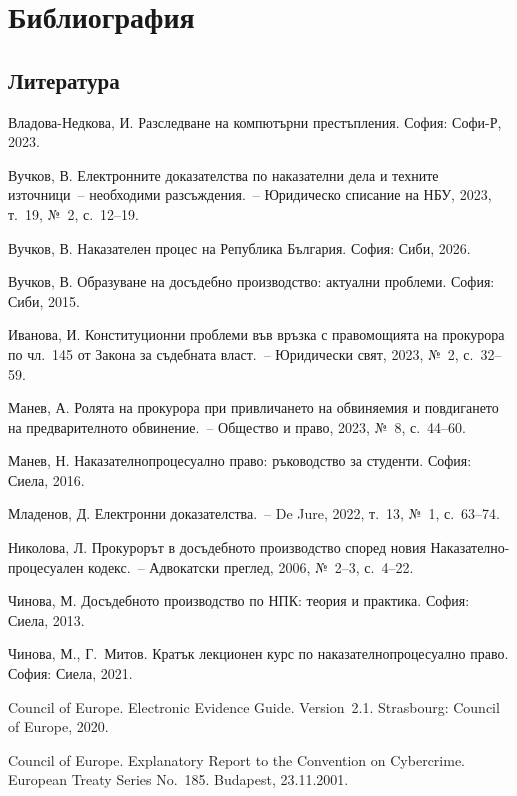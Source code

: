 \clearpage
\section*{Библиография}
\label{sec:bibliografiya}

{\small

\subsection*{Литература}
\begin{biblist}[series=bib]
\item Владова-Недкова, И. Разследване на компютърни престъпления. София: Софи-Р, 2023.
\item Вучков, В. Електронните доказателства по наказателни дела и техните източници~--
  необходими разсъждения.~-- Юридическо списание на НБУ, 2023, т.~19, №~2, с.~12--19.
\item Вучков, В. Наказателен процес на Република България. София: Сиби, 2026.
\item Вучков, В. Образуване на досъдебно производство: актуални проблеми. София: Сиби,
  2015.
\item Иванова, И. Конституционни проблеми във връзка с правомощията на прокурора по
  чл.~145 от Закона за съдебната власт.~-- Юридически свят, 2023, №~2, с.~32--59.
\item Манев, А. Ролята на прокурора при привличането на обвиняемия и повдигането на
  предварителното обвинение.~-- Общество и право, 2023, №~8, с.~44--60.
\item Манев, Н. Наказателнопроцесуално право: ръководство за студенти. София: Сиела, 2016.
\item Младенов, Д. Електронни доказателства.~-- De Jure, 2022, т.~13, №~1, с.~63--74.
\item Николова, Л. Прокурорът в досъдебното производство според новия
  Наказателно-процесуален кодекс.~-- Адвокатски преглед, 2006, №~2--3, с.~4--22.
\item Чинова, М. Досъдебното производство по НПК: теория и практика. София: Сиела, 2013.
\item Чинова, М., Г.~Митов. Кратък лекционен курс по наказателнопроцесуално право. София:
  Сиела, 2021.
\item Council of Europe. Electronic Evidence Guide. Version~2.1. Strasbourg: Council of
  Europe, 2020.
\item Council of Europe. Explanatory Report to the Convention on Cybercrime. European
  Treaty Series No.~185. Budapest, 23.11.2001.
\end{biblist}

}
